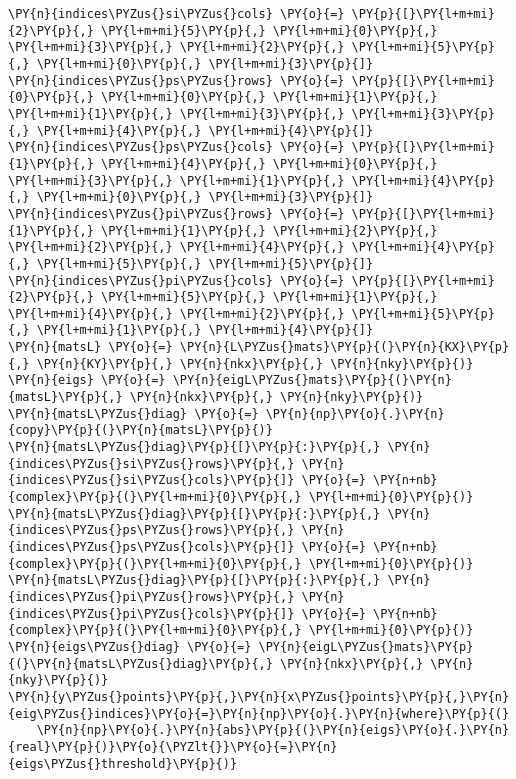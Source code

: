 \begin{Verbatim}[commandchars=\\\{\}]
\PY{n}{indices\PYZus{}si\PYZus{}cols} \PY{o}{=} \PY{p}{[}\PY{l+m+mi}{2}\PY{p}{,} \PY{l+m+mi}{5}\PY{p}{,} \PY{l+m+mi}{0}\PY{p}{,} \PY{l+m+mi}{3}\PY{p}{,} \PY{l+m+mi}{2}\PY{p}{,} \PY{l+m+mi}{5}\PY{p}{,} \PY{l+m+mi}{0}\PY{p}{,} \PY{l+m+mi}{3}\PY{p}{]}
\PY{n}{indices\PYZus{}ps\PYZus{}rows} \PY{o}{=} \PY{p}{[}\PY{l+m+mi}{0}\PY{p}{,} \PY{l+m+mi}{0}\PY{p}{,} \PY{l+m+mi}{1}\PY{p}{,} \PY{l+m+mi}{1}\PY{p}{,} \PY{l+m+mi}{3}\PY{p}{,} \PY{l+m+mi}{3}\PY{p}{,} \PY{l+m+mi}{4}\PY{p}{,} \PY{l+m+mi}{4}\PY{p}{]}
\PY{n}{indices\PYZus{}ps\PYZus{}cols} \PY{o}{=} \PY{p}{[}\PY{l+m+mi}{1}\PY{p}{,} \PY{l+m+mi}{4}\PY{p}{,} \PY{l+m+mi}{0}\PY{p}{,} \PY{l+m+mi}{3}\PY{p}{,} \PY{l+m+mi}{1}\PY{p}{,} \PY{l+m+mi}{4}\PY{p}{,} \PY{l+m+mi}{0}\PY{p}{,} \PY{l+m+mi}{3}\PY{p}{]}
\PY{n}{indices\PYZus{}pi\PYZus{}rows} \PY{o}{=} \PY{p}{[}\PY{l+m+mi}{1}\PY{p}{,} \PY{l+m+mi}{1}\PY{p}{,} \PY{l+m+mi}{2}\PY{p}{,} \PY{l+m+mi}{2}\PY{p}{,} \PY{l+m+mi}{4}\PY{p}{,} \PY{l+m+mi}{4}\PY{p}{,} \PY{l+m+mi}{5}\PY{p}{,} \PY{l+m+mi}{5}\PY{p}{]}
\PY{n}{indices\PYZus{}pi\PYZus{}cols} \PY{o}{=} \PY{p}{[}\PY{l+m+mi}{2}\PY{p}{,} \PY{l+m+mi}{5}\PY{p}{,} \PY{l+m+mi}{1}\PY{p}{,} \PY{l+m+mi}{4}\PY{p}{,} \PY{l+m+mi}{2}\PY{p}{,} \PY{l+m+mi}{5}\PY{p}{,} \PY{l+m+mi}{1}\PY{p}{,} \PY{l+m+mi}{4}\PY{p}{]}
\PY{n}{matsL} \PY{o}{=} \PY{n}{L\PYZus{}mats}\PY{p}{(}\PY{n}{KX}\PY{p}{,} \PY{n}{KY}\PY{p}{,} \PY{n}{nkx}\PY{p}{,} \PY{n}{nky}\PY{p}{)}
\PY{n}{eigs} \PY{o}{=} \PY{n}{eigL\PYZus{}mats}\PY{p}{(}\PY{n}{matsL}\PY{p}{,} \PY{n}{nkx}\PY{p}{,} \PY{n}{nky}\PY{p}{)}
\PY{n}{matsL\PYZus{}diag} \PY{o}{=} \PY{n}{np}\PY{o}{.}\PY{n}{copy}\PY{p}{(}\PY{n}{matsL}\PY{p}{)}
\PY{n}{matsL\PYZus{}diag}\PY{p}{[}\PY{p}{:}\PY{p}{,} \PY{n}{indices\PYZus{}si\PYZus{}rows}\PY{p}{,} \PY{n}{indices\PYZus{}si\PYZus{}cols}\PY{p}{]} \PY{o}{=} \PY{n+nb}{complex}\PY{p}{(}\PY{l+m+mi}{0}\PY{p}{,} \PY{l+m+mi}{0}\PY{p}{)}
\PY{n}{matsL\PYZus{}diag}\PY{p}{[}\PY{p}{:}\PY{p}{,} \PY{n}{indices\PYZus{}ps\PYZus{}rows}\PY{p}{,} \PY{n}{indices\PYZus{}ps\PYZus{}cols}\PY{p}{]} \PY{o}{=} \PY{n+nb}{complex}\PY{p}{(}\PY{l+m+mi}{0}\PY{p}{,} \PY{l+m+mi}{0}\PY{p}{)}
\PY{n}{matsL\PYZus{}diag}\PY{p}{[}\PY{p}{:}\PY{p}{,} \PY{n}{indices\PYZus{}pi\PYZus{}rows}\PY{p}{,} \PY{n}{indices\PYZus{}pi\PYZus{}cols}\PY{p}{]} \PY{o}{=} \PY{n+nb}{complex}\PY{p}{(}\PY{l+m+mi}{0}\PY{p}{,} \PY{l+m+mi}{0}\PY{p}{)}
\PY{n}{eigs\PYZus{}diag} \PY{o}{=} \PY{n}{eigL\PYZus{}mats}\PY{p}{(}\PY{n}{matsL\PYZus{}diag}\PY{p}{,} \PY{n}{nkx}\PY{p}{,} \PY{n}{nky}\PY{p}{)}
\PY{n}{y\PYZus{}points}\PY{p}{,}\PY{n}{x\PYZus{}points}\PY{p}{,}\PY{n}{eig\PYZus{}indices}\PY{o}{=}\PY{n}{np}\PY{o}{.}\PY{n}{where}\PY{p}{(}
    \PY{n}{np}\PY{o}{.}\PY{n}{abs}\PY{p}{(}\PY{n}{eigs}\PY{o}{.}\PY{n}{real}\PY{p}{)}\PY{o}{\PYZlt{}}\PY{o}{=}\PY{n}{eigs\PYZus{}threshold}\PY{p}{)}

\end{Verbatim}
